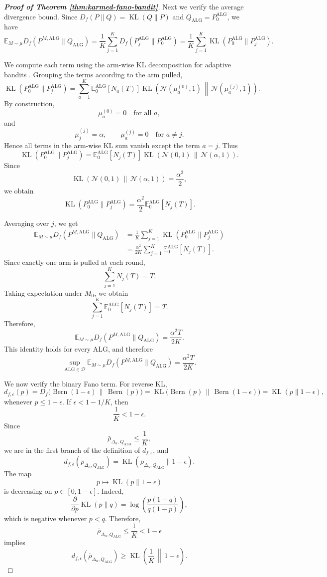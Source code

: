 \documentclass[journal]{IEEEtran}
\newcommand{\Bern}{\operatorname{Bern}}
\newcommand{\ALG}{\mathrm{ALG}}
\newcommand{\KL}{\operatorname{KL}}
\begin{document}
\begin{proof}[\textbf{Proof of Theorem \ref{thm:karmed-fano-bandit}}]
Next we verify the average divergence bound. Since \(D_f(P\|Q)=\KL(Q\|P)\)
and \(Q_\ALG=P_0^\ALG\), we have
\[
\mathbb E_{M\sim\mu}
D_f(P^{M,\ALG}\|Q_\ALG)
=
\frac1K
\sum_{j=1}^K
D_f(P_j^\ALG\|P_0^\ALG)
=
\frac1K
\sum_{j=1}^K
\KL(P_0^\ALG\|P_j^\ALG).
\]

We compute each term using the arm-wise KL decomposition for
adaptive bandits \cite[Lemma 15.1]{lattimore2020bandit}.
Grouping the terms according to the arm pulled,
\[
\KL(P_0^\ALG\|P_j^\ALG)
=
\sum_{a=1}^K
\mathbb E_0^\ALG[N_a(T)]
\KL\!\left(
\mathcal N(\mu_a^{(0)},1)
\,\middle\|\,
\mathcal N(\mu_a^{(j)},1)
\right).
\]
By construction,
\[
\mu_a^{(0)}=0
\quad\text{for all }a,
\]
and
\[
\mu_j^{(j)}=\alpha,
\qquad
\mu_a^{(j)}=0
\quad\text{for }a\neq j.
\]
Hence all terms in the arm-wise KL sum vanish except the term \(a=j\). Thus
\[
\KL(P_0^\ALG\|P_j^\ALG)
=
\mathbb E_0^\ALG[N_j(T)]
\KL\!\left(
\mathcal N(0,1)
\,\middle\|\,
\mathcal N(\alpha,1)
\right).
\]
Since
\[
\KL\!\left(
\mathcal N(0,1)
\,\middle\|\,
\mathcal N(\alpha,1)
\right)
=
\frac{\alpha^2}{2},
\]
we obtain
\[
\KL(P_0^\ALG\|P_j^\ALG)
=
\frac{\alpha^2}{2}
\mathbb E_0^\ALG[N_j(T)].
\]

Averaging over \(j\), we get
\[
\begin{aligned}
\mathbb E_{M\sim\mu}
D_f(P^{M,\ALG}\|Q_\ALG)
&=
\frac1K
\sum_{j=1}^K
\KL(P_0^\ALG\|P_j^\ALG)\\
&=
\frac{\alpha^2}{2K}
\sum_{j=1}^K
\mathbb E_0^\ALG[N_j(T)].
\end{aligned}
\]
Since exactly one arm is pulled at each round,
\[
\sum_{j=1}^K N_j(T)=T.
\]
Taking expectation under \(M_0\), we obtain
\[
\sum_{j=1}^K
\mathbb E_0^\ALG[N_j(T)]
=
T.
\]
Therefore,
\[
\mathbb E_{M\sim\mu}
D_f(P^{M,\ALG}\|Q_\ALG)
=
\frac{\alpha^2T}{2K}.
\]
This identity holds for every \(\ALG\), and therefore
\[
\sup_{\ALG\in\mathcal D}
\mathbb E_{M\sim\mu}
D_f(P^{M,\ALG}\|Q_\ALG)
=
\frac{\alpha^2T}{2K}.
\]

We now verify the binary Fano term. For reverse KL,
\[
d_{f,\epsilon}(p)
=
D_f\bigl(\Bern(1-\epsilon)\,\|\,\Bern(p)\bigr)
=
\KL\bigl(\Bern(p)\,\|\,\Bern(1-\epsilon)\bigr)
=
\KL(p\|1-\epsilon),
\]
whenever \(p\le 1-\epsilon\). If \(\epsilon<1-1/K\), then
\[
\frac1K<1-\epsilon.
\]
Since
\[
\bar\rho_{\Delta_\alpha,Q_\ALG}\le \frac1K,
\]
we are in the first branch of the definition of \(d_{f,\epsilon}\), and
\[
d_{f,\epsilon}(\bar\rho_{\Delta_\alpha,Q_\ALG})
=
\KL(\bar\rho_{\Delta_\alpha,Q_\ALG}\|1-\epsilon).
\]
The map
\[
p\mapsto \KL(p\|1-\epsilon)
\]
is decreasing on \(p\in[0,1-\epsilon]\). Indeed,
\[
\frac{\partial}{\partial p}\KL(p\|q)
=
\log\left(\frac{p(1-q)}{q(1-p)}\right),
\]
which is negative whenever \(p<q\). Therefore,
\[
\bar\rho_{\Delta_\alpha,Q_\ALG}\le \frac1K<1-\epsilon
\]
implies
\[
d_{f,\epsilon}(\bar\rho_{\Delta_\alpha,Q_\ALG})
\ge
\KL\left(\frac1K\,\middle\|\,1-\epsilon\right).
\]


\end{proof}
\end{document}
